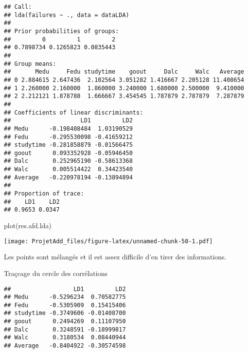 \documentclass[
]{article}
\newenvironment{Shaded}{\begin{snugshade}}{\end{snugshade}}
\newcommand{\AttributeTok}[1]{\textcolor[rgb]{0.77,0.63,0.00}{#1}}
\newcommand{\DecValTok}[1]{\textcolor[rgb]{0.00,0.00,0.81}{#1}}
\newcommand{\FunctionTok}[1]{\textcolor[rgb]{0.00,0.00,0.00}{#1}}
\newcommand{\NormalTok}[1]{#1}
\newcommand{\OtherTok}[1]{\textcolor[rgb]{0.56,0.35,0.01}{#1}}
\newcommand{\SpecialCharTok}[1]{\textcolor[rgb]{0.00,0.00,0.00}{#1}}
\begin{document}
\begin{verbatim}
## Call:
## lda(failures ~ ., data = dataLDA)
## 
## Prior probabilities of groups:
##         0         1         2 
## 0.7898734 0.1265823 0.0835443 
## 
## Group means:
##       Medu     Fedu studytime    goout     Dalc     Walc   Average
## 0 2.884615 2.647436  2.102564 3.051282 1.416667 2.205128 11.408654
## 1 2.260000 2.160000  1.860000 3.240000 1.680000 2.500000  9.410000
## 2 2.212121 1.878788  1.666667 3.454545 1.787879 2.787879  7.287879
## 
## Coefficients of linear discriminants:
##                    LD1         LD2
## Medu      -0.198408484  1.03190529
## Fedu      -0.295530098 -0.41659212
## studytime -0.281858879 -0.01566475
## goout      0.093352928 -0.05946450
## Dalc       0.252965190 -0.58613368
## Walc       0.005514422  0.34423540
## Average   -0.220978194 -0.13894894
## 
## Proportion of trace:
##    LD1    LD2 
## 0.9653 0.0347
\end{verbatim}

\begin{Shaded}
\begin{Highlighting}[]
\FunctionTok{plot}\NormalTok{(res.afd.lda)}
\end{Highlighting}
\end{Shaded}

\texttt{[image: ProjetAdd\_files/figure-latex/unnamed-chunk-50-1.pdf]}

Les points sont mélangés et il est assez difficile d'en tirer des
informations.

Traçcage du cercle des corrélations

\begin{Shaded}
\end{Shaded}

\begin{verbatim}
##                  LD1         LD2
## Medu      -0.5296234  0.70582775
## Fedu      -0.5305909  0.15415406
## studytime -0.3749606 -0.01408700
## goout      0.2494269  0.11107950
## Dalc       0.3248591 -0.18999817
## Walc       0.3180534  0.08440944
## Average   -0.8404922 -0.30574598
\end{verbatim}
\end{document}
